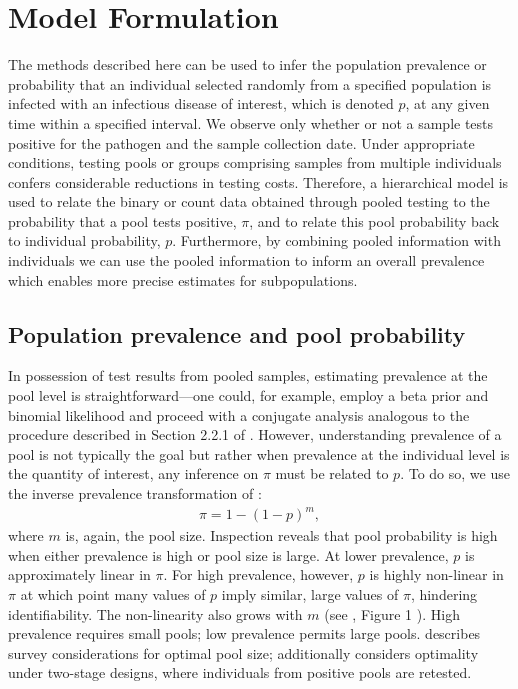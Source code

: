 \documentclass{article}
\begin{document}
\section{Model Formulation}

The methods described here can be used to infer the population prevalence or probability that an individual selected randomly from a specified population is infected with an infectious disease of interest, which is denoted $p$, at any given time within a specified interval. We observe only whether or not a sample tests positive for the pathogen and the sample collection date. Under appropriate conditions, testing pools or groups comprising samples from multiple individuals confers considerable reductions in testing costs. Therefore, a hierarchical model is used to relate the binary or count data obtained through pooled testing to the probability that a pool tests positive, $\pi$, and to relate this pool probability back to individual probability, $p$. Furthermore, by combining pooled information with individuals we can use the pooled information to inform an overall prevalence which enables more precise estimates for subpopulations.

\subsection{Population prevalence and pool probability}

In possession of test results from pooled samples, estimating prevalence at the pool level is straightforward—one could, for example, employ a beta prior and binomial likelihood and proceed with a conjugate analysis analogous to the procedure described in Section 2.2.1 of \cite{hoegh2021estimating}. However, understanding prevalence of a pool is not typically the goal but rather when prevalence at the individual level is the quantity of interest, any inference on $\pi$ must be related to $p$. To do so, we use the inverse prevalence transformation of \cite{colon2001estimating} :
\begin{align}
    \pi = 1 - (1 - p)^m,
\end{align}
where $m$ is, again, the pool size. Inspection reveals that pool probability is high when either prevalence is high or pool size is large. At lower prevalence, $p$ is approximately linear in $\pi$. For high prevalence, however, $p$ is highly non-linear in $\pi$ at which point many values of $p$ imply similar, large values of $\pi$, hindering identifiability. The non-linearity also grows with $m$ (see \cite{colon2001estimating}, Figure 1 ). High prevalence requires small pools; low prevalence permits large pools. \cite{swallow1985group} describes survey considerations for optimal pool size; \cite{reilly1996optimal} additionally considers optimality under two-stage designs, where individuals from positive pools are retested. 
\end{document}
